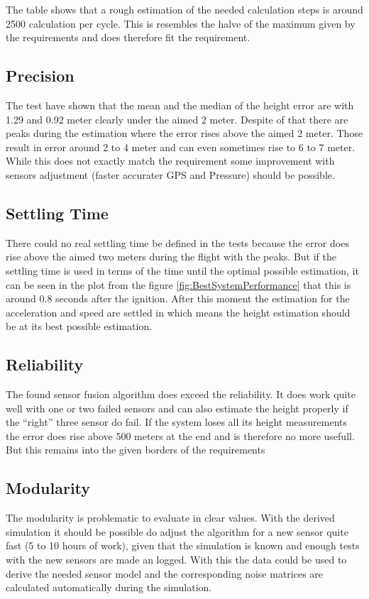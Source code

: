 The table shows that a rough estimation of the needed calculation steps is around 2500 calculation per cycle.
This is resembles the halve of the maximum given by the requirements and does therefore fit the requirement.
 
 
 \subsection{Precision}
 The test have shown that the mean and the median of the height error are with 1.29 and 0.92 meter clearly under the aimed 2 meter.
 Despite of that there are peaks during the estimation where the error rises above the aimed 2 meter.
 Those result in error around 2 to 4 meter and can even sometimes rise to 6 to 7 meter.
 While this does not exactly match the requirement some improvement with sensors adjustment (faster accurater GPS and Pressure) should be possible.
 
 \subsection{Settling Time}
 There could no real settling time be defined in the tests because the error does rise above the aimed two meters during the flight with the peaks.
 But if the settling time is used in terms of the time until the optimal possible estimation,
 it can be seen in the plot from the figure \ref{fig:BestSystemPerformance} that this is around 0.8 seconds after the ignition.
 After this moment the estimation for the acceleration and speed are settled in which means the height estimation should be at its best possible estimation.
 
 \subsection{Reliability}
 The found sensor fusion algorithm does exceed the reliability. 
 It does work quite well with one or two failed sensors and can also estimate the height properly if the ``right'' three sensor do fail.
 If the system loses all its height measurements the error does rise above 500 meters at the end and is therefore no more usefull.
 But this remains into the given borders of the requirements
 
 \subsection{Modularity}
 The modularity is problematic to evaluate in clear values.
 With the derived simulation it should be possible do adjust the algorithm for a new sensor quite fast (5 to 10 hours of work), 
 given that the simulation is known and enough tests with the new sensors are made an logged.
 With this the data could be used to derive the needed sensor model and the corresponding noise matrices are calculated automatically during the simulation.
 

